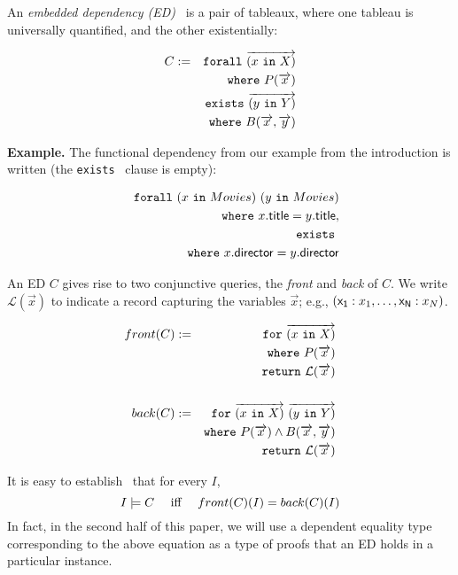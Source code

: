 \documentclass[preprint]{sigplanconf}
\newcommand{\FOR}{{\tt for} \ }
\newcommand{\FORALL}{{\tt forall} \ }
\newcommand{\EXISTS}{{\tt exists} \ }
\newcommand{\WHERE}{{\tt where} \ }
\newcommand{\IN}{ \ {\tt in} \ }
\newcommand{\RETURN}{{\tt return} \ }
\begin{document}
An {\it embedded dependency (ED)}~\cite{foundations} is a pair of tableaux, where one tableau is universally quantified, and the other existentially:
\begin{normalsize}
\begin{eqnarray*}
C & := & \FORALL \overrightarrow{(x \IN X)} \\
 & & \WHERE P(\overrightarrow{x}) \\
 & & \EXISTS \overrightarrow{(y \IN Y)} \\
 & & \WHERE B(\overrightarrow{x}, \overrightarrow{y})
\end{eqnarray*}
\end{normalsize}
{\bf Example.} The functional dependency from our example from the introduction is written (the \EXISTS clause is empty):
\begin{normalsize}
\begin{eqnarray*}
& & \FORALL (x \IN Movies) \ (y \IN Movies) \\
& & \WHERE x.{\sf title} = y.{\sf title}, \\ 
& & \EXISTS \\
& & \WHERE x.{\sf director} = y.{\sf director}
\end{eqnarray*}
\end{normalsize}
An ED $C$ gives rise to two conjunctive queries, the {\it front} and {\it back} of $C$.  We write $\mathcal{L}
(\overrightarrow{x})$ to indicate a record capturing the variables $\overrightarrow{x}
$; e.g., $({\sf x_1}: x_1, \ldots ,{\sf x_N}: x_N)$.  %
\begin{normalsize}
\begin{eqnarray*}
front(C)& := & \FOR \overrightarrow{(x \IN X)} \\ 
& & \WHERE P(\overrightarrow{x}) \\
& & \RETURN \mathcal{L}(\overrightarrow{x})  \\
& & \\
back(C) & := & \FOR \overrightarrow{(x \IN X)} \ \overrightarrow{(y \IN Y)} \\ 
& & \WHERE P(\overrightarrow{x}) \wedge B(\overrightarrow{x}, \overrightarrow{y}) \\
& & \RETURN \mathcal{L}(\overrightarrow{x})
\end{eqnarray*}
\end{normalsize}
It is easy to establish~\cite{Popa99anequational} that for every $I$,
$$I \models C \ \ \ \ \textnormal{iff} \ \ \ \  front(C)(I) = back(C)(I)$$
In fact, in the second half of this paper, we will use a dependent equality type corresponding to the above equation as a type of proofs that an ED holds in a particular instance.
\end{document}
